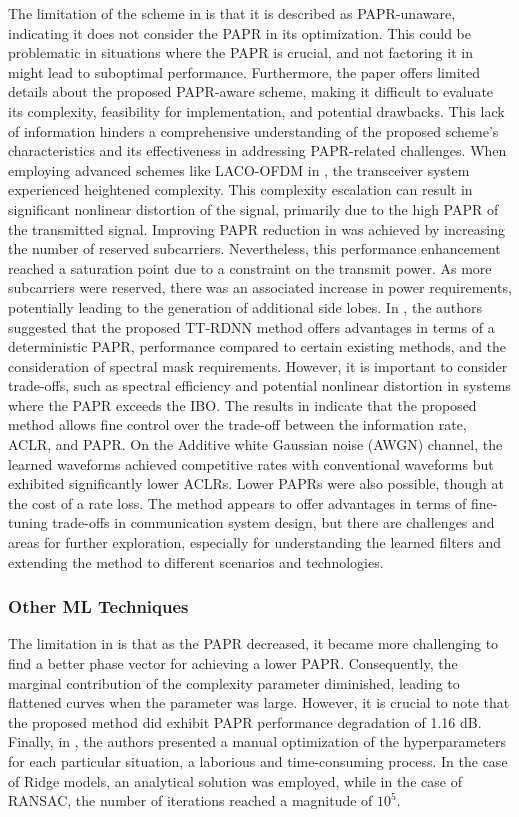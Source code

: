 \documentclass[conference]{IEEEtran}
\begin{document}
The limitation of the scheme in \cite{b150} is that it is described as PAPR-unaware, indicating it does not consider the PAPR in its optimization. This could be problematic in situations where the PAPR is crucial, and not factoring it in might lead to suboptimal performance. Furthermore, the paper offers limited details about the proposed PAPR-aware scheme, making it difficult to evaluate its complexity, feasibility for implementation, and potential drawbacks. This lack of information hinders a comprehensive understanding of the proposed scheme's characteristics and its effectiveness in addressing PAPR-related challenges. When employing advanced schemes like LACO-OFDM in \cite{b151}, the transceiver system experienced heightened complexity. This complexity escalation can result in significant nonlinear distortion of the signal, primarily due to the high PAPR of the transmitted signal. Improving PAPR reduction in \cite{b152} was achieved by increasing the number of reserved subcarriers. Nevertheless, this performance enhancement reached a saturation point due to a constraint on the transmit power. As more subcarriers were reserved, there was an associated increase in power requirements, potentially leading to the generation of additional side lobes. In \cite{b153}, the authors suggested that the proposed TT-RDNN method offers advantages in terms of a deterministic PAPR, performance compared to certain existing methods, and the consideration of spectral mask requirements. However, it is important to consider trade-offs, such as spectral efficiency and potential nonlinear distortion in systems where the PAPR exceeds the IBO. The results in \cite{b154} indicate that the proposed method allows fine control over the trade-off between the information rate, ACLR, and PAPR. On the Additive white Gaussian noise (AWGN) channel, the learned waveforms achieved competitive rates with conventional waveforms but exhibited significantly lower ACLRs. Lower PAPRs were also possible, though at the cost of a rate loss. The method appears to offer advantages in terms of fine-tuning trade-offs in communication system design, but there are challenges and areas for further exploration, especially for understanding the learned filters and extending the method to different scenarios and technologies.

\subsubsection{Other ML Techniques \cite{b134, b155}}
The limitation in \cite{b155} is that as the PAPR decreased, it became more challenging to find a better phase vector for achieving a lower PAPR. Consequently, the marginal contribution of the complexity parameter diminished, leading to flattened curves when the parameter was large. However, it is crucial to note that the proposed method did exhibit PAPR performance degradation of 1.16 dB. Finally, in \cite{b134}, the authors presented a manual optimization of the hyperparameters for each particular situation, a laborious and time-consuming process. In the case of Ridge models, an analytical solution was employed, while in the case of RANSAC, the number of iterations reached a magnitude of $10^5$.
\end{document}

